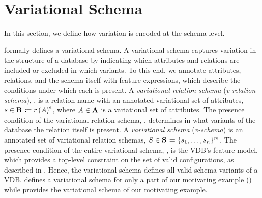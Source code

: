 \section{Variational Schema}
\label{sec:vsch}

%

In this section, we define how variation is encoded at the schema level. 

 formally defines a variational schema. 
A variational schema captures variation in the structure of a database by indicating which attributes and relations are included or excluded in which variants.
%
To this end, we annotate attributes, relations, and the schema itself with
feature expressions,
which describe the conditions under which each is present.
%
A \emph{variational relation schema} (\emph{v-relation schema}), \vRelSch, is a relation name
with an annotated variational set of attributes,
$\synDef {\vRelSch} \vRelSchSet \eqq \vRelDef$,
where \ensuremath{\vAttList \in \vAttSet} is a variational set of attributes.
The presence condition of the variational relation schema, \dimMeta, determines in what
variants of the database the relation itself is present.
%
A \emph{variational schema} (\emph{v-schema}) is an annotated set of variational relation 
schemas,
$\synDef \vSch \vSchSet \eqq \vSchDef$.
The presence condition of the entire variational schema, \fModel, is the VDB's feature
model, which provides a top-level constraint on the set of valid
configurations, as described in .
Hence, the variational schema defines all valid schema variants of a VDB. 
 defines a variational schema for only a part of our motivating example () while
  provides the variational schema of our motivating example. 


